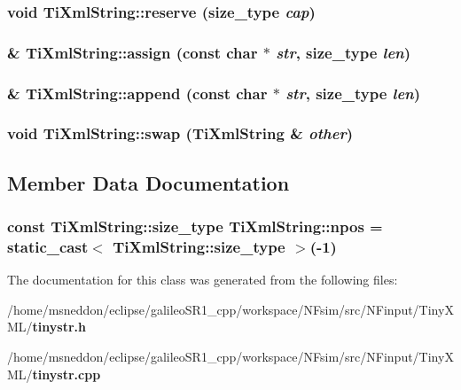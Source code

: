 \subsubsection{\setlength{\rightskip}{0pt plus 5cm}void TiXmlString::reserve ({\bf size\_\-type} {\em cap})}\label{classTiXmlString_88ecf9f0f00cb5c67b6b637958d7049c}


\subsubsection{ \& TiXmlString::assign (const char $\ast$ {\em str}, {\bf size\_\-type} {\em len})}\label{classTiXmlString_c72f3d9149b7812c1e6c59402014d0d5}


\subsubsection{ \& TiXmlString::append (const char $\ast$ {\em str}, {\bf size\_\-type} {\em len})}\label{classTiXmlString_d44b21700d2ec24a511367b222b643fb}


\subsubsection{\setlength{\rightskip}{0pt plus 5cm}void TiXmlString::swap ({\bf TiXmlString} \& {\em other})\hspace{0.3cm}{\tt  [inline]}}\label{classTiXmlString_a392cbc180752a79f007f4f9280c7762}




\subsection{Member Data Documentation}
\subsubsection{\setlength{\rightskip}{0pt plus 5cm}const {\bf TiXmlString::size\_\-type} {\bf TiXmlString::npos} = static\_\-cast$<$ {\bf TiXmlString::size\_\-type} $>$(-1)\hspace{0.3cm}{\tt  [static]}}\label{classTiXmlString_8f4422d227088dc7bec96f479b275d0a}




The documentation for this class was generated from the following files:\begin{CompactItemize}
\item 
/home/msneddon/eclipse/galileoSR1\_\-cpp/workspace/NFsim/src/NFinput/TinyXML/{\bf tinystr.h}\item 
/home/msneddon/eclipse/galileoSR1\_\-cpp/workspace/NFsim/src/NFinput/TinyXML/{\bf tinystr.cpp}\end{CompactItemize}
